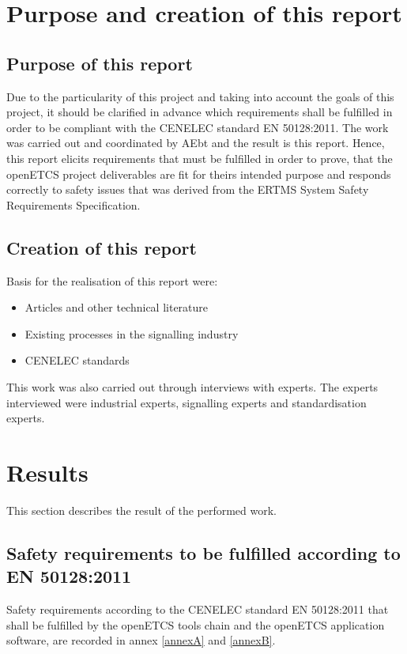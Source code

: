 \documentclass{template/openetcs_report}
\begin{document}
\chapter{Purpose and creation of this report}

\section{Purpose of this report}
Due to the particularity of this project and taking into account the goals of this project, it should be clarified in advance which requirements shall be fulfilled in order to be compliant with the CENELEC standard EN 50128:2011. The work was carried out and coordinated by AEbt and the result is this report. Hence, this report elicits requirements that must be fulfilled in order to prove, that the openETCS project deliverables are fit for theirs intended purpose and responds correctly to safety issues that was derived from the ERTMS System Safety Requirements Specification.

\section{Creation of this report}
\label{report}
Basis for the realisation of this report were:
\begin{itemize}
  \item Articles and other technical literature
  \item Existing processes in the signalling industry
  \item CENELEC standards
\end{itemize}

This work was also carried out through interviews with experts. The experts interviewed were industrial experts, signalling experts and standardisation experts. 


\chapter{Results}

This section describes the result of the performed work.

\section{Safety requirements to be fulfilled according to EN 50128:2011}

Safety requirements according to the CENELEC standard EN 50128:2011 that shall be fulfilled by the openETCS tools chain and the openETCS application software, are recorded in annex \ref{annexA} and \ref{annexB}.
\end{document}
